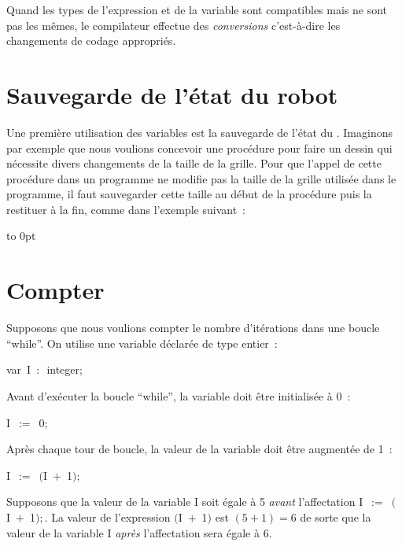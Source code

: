 
\noindent  Quand les types de l'expression et de la variable sont 
compatibles mais ne sont pas les mêmes, le compilateur 
effectue des {\em conversions}
c'est-à-dire les changements de codage appropriés.

\section{Sauvegarde de l'état du robot}

Une première utilisation des variables est la sauvegarde de l'état du \robot. Imaginons par 
exemple que nous voulions concevoir une procédure pour faire un dessin qui nécessite divers 
changements de la taille de la grille. Pour que l'appel de
cette procédure dans un programme ne modifie pas la taille de la grille utilisée dans le 
programme, il faut sauvegarder cette
taille au début de la procédure puis la restituer à la fin, comme dans l'exemple suivant~:

{\raggedright 
 \vbox to 0pt{}%
 
 }
 
\section{Compter}
Supposons que nous voulions
compter le nombre d'itérations dans une boucle ``while''. On utilise une variable déclarée de 
type entier~: 

\mbox{\blc  \blk\idt  \mcl var\idt\ I\ $:$\ integer$;$}\par 

\noindent Avant d'exécuter la boucle ``while'', la variable doit être initialisée à 0~:

\mbox{\blc  \blk\blk\idt  I\ $:=$\ 0$;$}\par 

\noindent Après chaque tour de boucle, la valeur de la variable doit être augmentée de 1~:

\mbox{\blc  \blk\blk\idt  I\ $:=$\ $($I\ $+$\ 1$);$}\par 

\noindent Supposons que la valeur de la variable {\idt I} soit égale à 5 {\em avant} l'affectation 
\mbox{\idt  I\ $:=$\ $($I\ $+$\ 1$);$}. La valeur de l'expression {\idt  $($I\ $+$\ 1$)$}
est $(5 + 1) = 6$ de sorte que la valeur de la variable {\idt I} {\em après} l'affectation sera égale
à 6.

